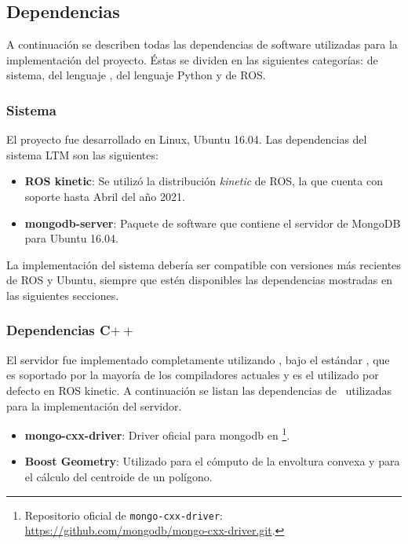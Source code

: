 \subsection{Dependencias}

A continuación se describen todas las dependencias de software utilizadas para la implementación del proyecto. Éstas se dividen en las siguientes categorías: de sistema, del lenguaje \CC, del lenguaje Python y de ROS.


\subsubsection{Sistema}

El proyecto fue desarrollado en Linux, Ubuntu 16.04. Las dependencias del sistema LTM son las siguientes:

\begin{itemize}
\item {\bfseries ROS kinetic}: Se utilizó la distribución \textit{kinetic} de ROS, la que cuenta con soporte hasta Abril del año 2021.
\item {\bfseries mongodb-server}: Paquete de software que contiene el servidor de MongoDB para Ubuntu 16.04.
\end{itemize}

La implementación del sistema debería ser compatible con versiones más recientes de ROS y Ubuntu, siempre que estén disponibles las dependencias mostradas en las siguientes secciones.


\subsubsection{Dependencias C$++$}

El servidor fue implementado completamente utilizando \CC, bajo el estándar , que es soportado por la mayoría de los compiladores actuales y es el utilizado por defecto en ROS kinetic. A continuación se listan las dependencias de \CC \ utilizadas para la implementación del servidor.

\begin{itemize}
	\item {\bfseries mongo-cxx-driver}: Driver oficial para mongodb en \CC\footnote{Repositorio oficial de \texttt{mongo-cxx-driver}: \url{https://github.com/mongodb/mongo-cxx-driver.git}.}. 
	\item {\bfseries Boost Geometry}: Utilizado para el cómputo de la envoltura convexa y para el cálculo del centroide de un polígono.
\end{itemize}


